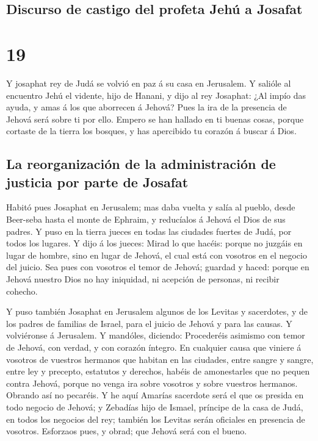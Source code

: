 \hypertarget{discurso-de-castigo-del-profeta-jehuxfa-a-josafat}{%
\subsection{Discurso de castigo del profeta Jehú a
Josafat}\label{discurso-de-castigo-del-profeta-jehuxfa-a-josafat}}

\hypertarget{section-18}{%
\section{19}\label{section-18}}

 Y josaphat rey de Judá se volvió en paz á su casa en
Jerusalem.  Y salióle al encuentro Jehú el vidente, hijo de
Hanani, y dijo al rey Josaphat: ¿Al impío das ayuda, y amas á los que
aborrecen á Jehová? Pues la ira de la presencia de Jehová será sobre ti
por ello.  Empero se han hallado en ti buenas cosas, porque
cortaste de la tierra los bosques, y has apercibido tu corazón á buscar
á Dios.

\hypertarget{la-reorganizaciuxf3n-de-la-administraciuxf3n-de-justicia-por-parte-de-josafat}{%
\subsection{La reorganización de la administración de justicia por parte
de
Josafat}\label{la-reorganizaciuxf3n-de-la-administraciuxf3n-de-justicia-por-parte-de-josafat}}

 Habitó pues Josaphat en Jerusalem; mas daba vuelta y salía
al pueblo, desde Beer-seba hasta el monte de Ephraim, y reducíalos á
Jehová el Dios de sus padres.  Y puso en la tierra jueces en
todas las ciudades fuertes de Judá, por todos los lugares. 
Y dijo á los jueces: Mirad lo que hacéis: porque no juzgáis en lugar de
hombre, sino en lugar de Jehová, el cual está con vosotros en el negocio
del juicio.  Sea pues con vosotros el temor de Jehová;
guardad y haced: porque en Jehová nuestro Dios no hay iniquidad, ni
acepción de personas, ni recibir cohecho.

 Y puso también Josaphat en Jerusalem algunos de los Levitas
y sacerdotes, y de los padres de familias de Israel, para el juicio de
Jehová y para las causas. Y volviéronse á Jerusalem.  Y
mandóles, diciendo: Procederéis asimismo con temor de Jehová, con
verdad, y con corazón íntegro.  En cualquier causa que
viniere á vosotros de vuestros hermanos que habitan en las ciudades,
entre sangre y sangre, entre ley y precepto, estatutos y derechos,
habéis de amonestarles que no pequen contra Jehová, porque no venga ira
sobre vosotros y sobre vuestros hermanos. Obrando así no pecaréis.
 Y he aquí Amarías sacerdote será el que os presida en todo
negocio de Jehová; y Zebadías hijo de Ismael, príncipe de la casa de
Judá, en todos los negocios del rey; también los Levitas serán oficiales
en presencia de vosotros. Esforzaos pues, y obrad; que Jehová será con
el bueno.

